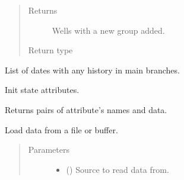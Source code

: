 \documentclass[letterpaper,10pt,english]{sphinxmanual}
\begin{document}
\begin{fulllineitems}
\begin{fulllineitems}
\begin{quote}
\begin{description}
\item[{Returns}] \leavevmode
{} \textendash{} Wells with a new group added.

\item[{Return type}] \leavevmode
{\hyperref[\detokenize{api/wells:geology.src.wells.Wells}]{}}

\end{description}\end{quote}

\end{fulllineitems}


\begin{fulllineitems}
\label{\detokenize{api/wells:geology.src.wells.Wells.history_dates}}
List of dates with any history in main branches.

\end{fulllineitems}


\begin{fulllineitems}
\label{\detokenize{api/wells:geology.src.wells.Wells.init_state}}
Init state attributes.

\end{fulllineitems}


\begin{fulllineitems}
\label{\detokenize{api/wells:geology.src.wells.Wells.items}}
Returns pairs of attribute’s names and data.

\end{fulllineitems}


\begin{fulllineitems}
\label{\detokenize{api/wells:geology.src.wells.Wells.load}}
Load data from a file or buffer.
\begin{quote}\begin{description}
\item[{Parameters}] \leavevmode\begin{itemize}
\item {} 
 () \textendash{} Source to read data from.


\end{itemize}
\end{description}
\end{quote}
\end{fulllineitems}
\end{fulllineitems}
\end{document}
